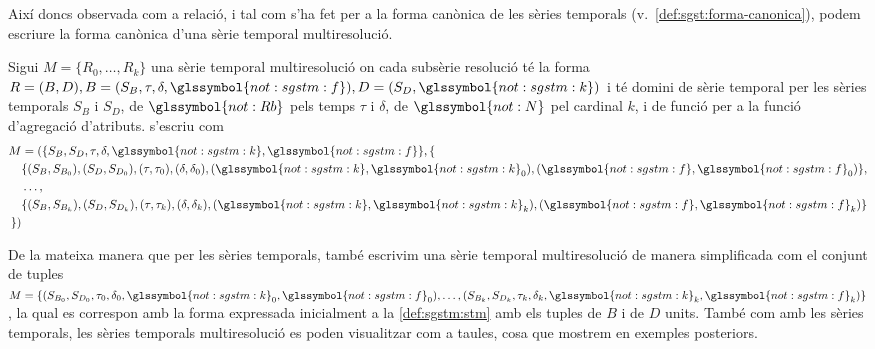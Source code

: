 Així doncs observada com a relació, i tal com s'ha fet per a la forma
canònica de les sèries temporals
(v.~\autoref{def:sgst:forma-canonica}), podem escriure la forma
canònica d'una sèrie temporal multiresolució.
\begin{definition}
  Sigui $M=\{R_0,\dotsc,R_k\}$ una sèrie temporal multiresolució on
  cada subsèrie resolució té la forma $R =(B,D),
  B=(S_{B},\tau,\delta,\glssymbol{not:sgstm:f}),
  D=(S_{D},\glssymbol{not:sgstm:k})$ i té domini de sèrie temporal
  per les sèries temporals $S_{B}$ i $S_{D}$, de
  $\glssymbol{not:Rb}$ pels temps $\tau$ i $\delta$, de
  $\glssymbol{not:N}$ pel cardinal $k$, i de funció per a la funció
  d'agregació d'atributs.  s'escriu com 
  \begin{align*} 
    M &= (\{S_B, S_D, \tau,
  \delta,\glssymbol{not:sgstm:k}, \glssymbol{not:sgstm:f}\}, \{ \\
  &\{ (S_B, S_{B_0}) , (S_D , S_{D_0}) , (\tau, \tau_0), (\delta,
  \delta_0), (\glssymbol{not:sgstm:k}, \glssymbol{not:sgstm:k}_0), (\glssymbol{not:sgstm:f}, \glssymbol{not:sgstm:f}_0) \} ,\\
    &\dotsc,\\
   &\{ (S_B, S_{B_k}) , (S_D
  , S_{D_k}) , (\tau, \tau_k), (\delta, \delta_k), (\glssymbol{not:sgstm:k}, \glssymbol{not:sgstm:k}_k), (\glssymbol{not:sgstm:f}, \glssymbol{not:sgstm:f}_k)
  \}\\
  \} )
\end{align*}

\end{definition}



De la mateixa manera que per les sèries temporals, també escrivim una
sèrie temporal multiresolució de manera simplificada com el conjunt de
tuples $M = \{ (S_{B_0}, S_{D_0} , \tau_0, \delta_0,
\glssymbol{not:sgstm:k}_0, \glssymbol{not:sgstm:f}_0 ), \dotsc,
(S_{B_k}, S_{D_k} , \tau_k, \delta_k, \glssymbol{not:sgstm:k}_k,
\glssymbol{not:sgstm:f}_k ) \}$, la qual es correspon amb la forma
expressada inicialment a la \autoref{def:sgstm:stm} amb els tuples de
$B$ i de $D$ units.  També com amb les sèries temporals, les sèries
temporals multiresolució es poden visualitzar com a taules, cosa que
mostrem en exemples posteriors.






